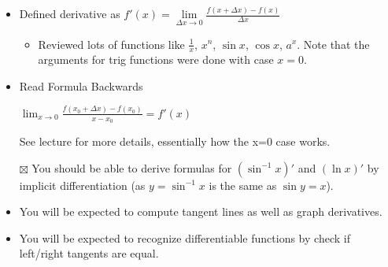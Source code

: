 \documentclass[letterpaper]{article}
\begin{document}
\begin{itemize}
\item Defined derivative as \(f'(x) = \lim\limits_{\Delta x\rightarrow0} \frac{f(x+\Delta x) - f(x)}{\Delta x}\)
\begin{itemize}
\item Reviewed lots of functions like \(\frac{1}{x}\), \(x^n\), \(\sin{x}\), \(\cos{x}\), \(a^x\). Note that the arguments for trig functions were done with case \(x=0\).
\end{itemize}
\item Read Formula Backwards

\(\lim_{x\rightarrow0} \frac{f(x_0+\Delta x) - f(x_0)}{x-x_0} = f'(x)\)

See lecture for more details, essentially how the x=0 case works.

\item[{$\boxtimes$}] You should be able to derive formulas for \((\sin^{-1}{x})'\) and \((\ln{x})'\) by implicit differentiation (as \(y=\sin^{-1}{x}\) is the same as \(\sin{y} = x\)).
\item You will be expected to compute tangent lines as well as graph derivatives.
\item You will be expected to recognize differentiable functions by check if left/right tangents are equal.
\end{itemize}
\end{document}
